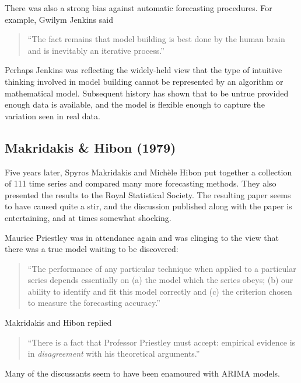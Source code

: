 \documentclass[11pt,a4paper,]{article}
\begin{document}
There was also a strong bias against automatic forecasting procedures. For example, Gwilym Jenkins said

\begin{quote}
``The fact remains that model building is best done by the human brain and is inevitably an iterative process.''
\end{quote}

Perhaps Jenkins was reflecting the widely-held view that the type of intuitive thinking involved in model building cannot be represented by an algorithm or mathematical model. Subsequent history has shown that to be untrue provided enough data is available, and the model is flexible enough to capture the variation seen in real data.

\hypertarget{makridakis-hibon-1979}{%
\subsection*{Makridakis \& Hibon (1979)}\label{makridakis-hibon-1979}}

Five years later, Spyros Makridakis and Michèle Hibon put together a collection of 111 time series and compared many more forecasting methods. They also presented the results to the Royal Statistical Society. The resulting paper \autocite{Makridakis1979} seems to have caused quite a stir, and the discussion published along with the paper is entertaining, and at times somewhat shocking.

Maurice Priestley was in attendance again and was clinging to the view that there was a true model waiting to be discovered:

\begin{quote}
``The performance of any particular technique when applied to a particular series depends essentially on (a) the model which the series obeys; (b) our ability to identify and fit this model correctly and (c) the criterion chosen to measure the forecasting accuracy.''
\end{quote}

Makridakis and Hibon replied

\begin{quote}
``There is a fact that Professor Priestley must accept: empirical evidence is in \emph{disagreement} with his theoretical arguments.''
\end{quote}

Many of the discussants seem to have been enamoured with ARIMA models.
\end{document}
